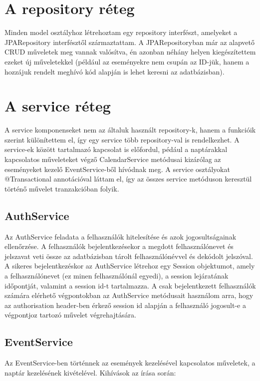 \documentclass[a4paper,12pt]{report}
\theoremstyle{definition}
\theoremstyle{remark}
\begin{document}
\section{A repository réteg}

Minden model osztályhoz létrehoztam egy repository interfészt, amelyeket a JPARepository interfésztől származtattam. A JPARepositoryban már az alapvető CRUD műveletek meg vannak valósítva, én azonban néhány helyen kiegészítettem ezeket új műveletekkel (például az eseményekre nem csupán az ID-jük, hanem a hozzájuk rendelt meghívó kód alapján is lehet keresni az adatbázisban).

\section{A service réteg}

A service komponenseket nem az általuk használt repository-k, hanem a funkcióik szerint különítettem el, így egy service több repository-val is rendelkezhet. A service-ek között tartalmazó kapcsolat is előfordul, pédául a naptárakkal kapcsolatos műveleteket végző CalendarService metódusai kizárólag az eseményeket kezelő EventService-ből hívódnak meg. A service osztályokat @Transactional annotációval láttam el, így az összes service metóduson keresztül történő művelet tranzakcióban folyik.

\subsection{AuthService}

Az AuthService feladata a felhasználók hitelesítése és azok jogosultságainak ellenőrzése. A felhasználók bejelentkezésekor a megdott felhasználónevet és jelszavat veti össze az adatbázisban tárolt felhasználónévvel és dekódolt jelszóval. A sikeres bejelentkezéskor az AuthService létrehoz egy Session objektumot, amely a felhasználónevet (ez minen felhasználónál egyedi), a session lejáratának időpontját, valamint a session id-t tartalmazza.  A csak bejelentkezett felhasználók számára elérhető végpontokban az AuthService metódusait használom arra, hogy az authorisation header-ben érkező session id alapján a felhasználó jogosult-e a végpontjoz tartozó művelet végrehajtására.

\subsection{EventService}

Az EventService-ben történnek az események kezelésével kapcsolatos műveletek, a naptár kezelésének kivételével. Kihívások az írása során:
\end{document}
